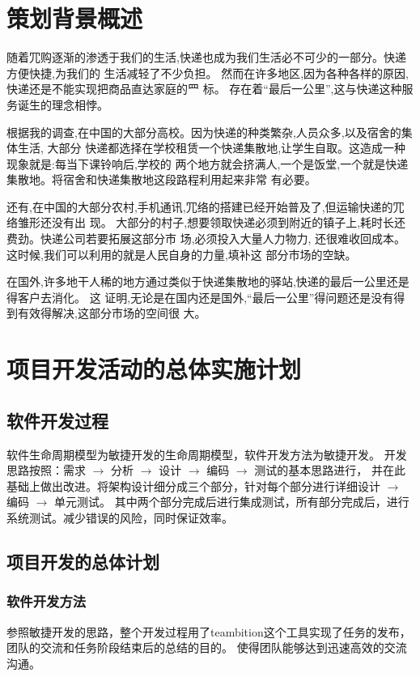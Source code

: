 \documentclass[UTF8]{dingo}
\begin{document}
  \section{策划背景概述}
    随着⺴购逐渐的渗透于我们的生活,快递也成为我们生活必不可少的一部分。快递方便快捷,为我们的 生活减轻了不少负担。
    然而在许多地区,因为各种各样的原因,快递还是不能实现把商品直达家庭的⺫ 标。
    存在着“最后一公里”,这与快递这种服务诞生的理念相悖。

    根据我的调查,在中国的大部分高校。因为快递的种类繁杂,人员众多,以及宿舍的集体生活,
    大部分 快递都选择在学校租赁一个快递集散地,让学生自取。这造成一种现象就是:每当下课铃响后,学校的
    两个地方就会挤满人,一个是饭堂,一个就是快递集散地。将宿舍和快递集散地这段路程利用起来非常 有必要。

    还有,在中国的大部分农村,手机通讯,⺴络的搭建已经开始普及了,但运输快递的⺴络雏形还没有出 现。
    大部分的村子,想要领取快递必须到附近的镇子上,耗时⻓还费劲。快递公司若要拓展这部分市 场,必须投入大量人力物力,
    还很难收回成本。这时候,我们可以利用的就是人民自身的力量,填补这 部分市场的空缺。

    在国外,许多地干人稀的地方通过类似于快递集散地的驿站,快递的最后一公里还是得客户去消化。
    这 证明,无论是在国内还是国外,“最后一公里”得问题还是没有得到有效得解决,这部分市场的空间很 大。

  \section{项目开发活动的总体实施计划}
    \subsection{软件开发过程}
      软件生命周期模型为敏捷开发的生命周期模型，软件开发方法为敏捷开发。
      开发思路按照：需求 $\rightarrow$ 分析  $\rightarrow$ 设计  $\rightarrow$ 编码  $\rightarrow$ 测试的基本思路进行，
      并在此基础上做出改进。将架构设计细分成三个部分，针对每个部分进行详细设计 $\rightarrow$ 编码 $\rightarrow$ 单元测试。
      其中两个部分完成后进行集成测试，所有部分完成后，进行系统测试。减少错误的风险，同时保证效率。
    \subsection{项目开发的总体计划}
      \subsubsection{软件开发方法}
        参照敏捷开发的思路，整个开发过程用了teambition这个工具实现了任务的发布，团队的交流和任务阶段结束后的总结的目的。
        使得团队能够达到迅速高效的交流沟通。
\end{document}
